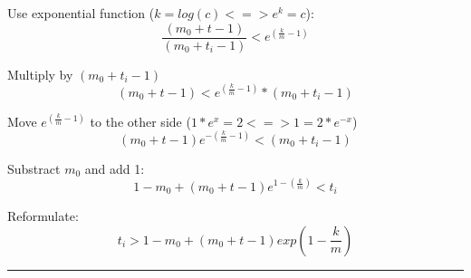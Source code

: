 \begin{enumerate}
	Use exponential function ($k=log(c) <=> e^k=c$):
	\begin{equation*}
		\frac{(m_0 + t - 1)}{(m_0 + t_i - 1)} < e^{(\frac{k}{m} - 1)}
	\end{equation*}
	
	Multiply by $(m_0 + t_i - 1)$
	\begin{equation*}
		(m_0 + t - 1) < e^{(\frac{k}{m} - 1)} * (m_0 + t_i - 1)
	\end{equation*}
	
	Move $e^{(\frac{k}{m} - 1)}$ to the other side ($1 * e^x = 2 <=> 1 = 2 * e^{-x} $)
	\begin{equation*}
		(m_0 + t - 1) e^{-(\frac{k}{m} - 1)} < (m_0 + t_i - 1)
	\end{equation*}
	
	Substract $m_0$ and add 1:
	\begin{equation*}
		1 - m_0 + (m_0 + t - 1) e^{1 - (\frac{k}{m})} < t_i
	\end{equation*}
	
	Reformulate:
	\begin{equation*}
		t_i > 1 - m_0 + (m_0 + t - 1) exp(1 - \frac{k}{m})
	\end{equation*}
	
	\hrule \relax

\end{enumerate}